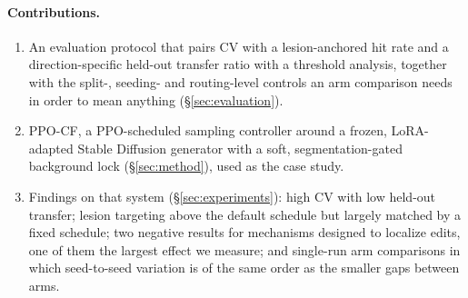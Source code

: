 \paragraph{Contributions.}
\begin{enumerate}
    \item An evaluation protocol that pairs CV with a lesion-anchored hit rate and a direction-specific held-out transfer ratio with a threshold analysis, together with the split-, seeding- and routing-level controls an arm comparison needs in order to mean anything (\S\ref{sec:evaluation}).
    \item PPO-CF, a PPO-scheduled sampling controller around a frozen, LoRA-adapted Stable Diffusion generator with a soft, segmentation-gated background lock (\S\ref{sec:method}), used as the case study.
    \item Findings on that system (\S\ref{sec:experiments}): high CV with low held-out transfer; lesion targeting above the default schedule but largely matched by a fixed schedule; two negative results for mechanisms designed to localize edits, one of them the largest effect we measure; and single-run arm comparisons in which seed-to-seed variation is of the same order as the smaller gaps between arms.
\end{enumerate}
